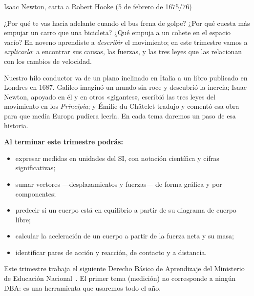 \documentclass[11pt]{article}
\begin{document}
\encabezado

{Isaac Newton, carta a Robert Hooke (5 de febrero de 1675/76)}


¿Por qué te vas hacia adelante cuando el bus frena de golpe? ¿Por qué cuesta más empujar un
carro que una bicicleta? ¿Qué empuja a un cohete en el espacio vacío? En noveno aprendiste a
\emph{describir} el movimiento; en este trimestre vamos a \emph{explicarlo}: a encontrar sus
causas, las fuerzas, y las tres leyes que las relacionan con los cambios de velocidad.

Nuestro hilo conductor va de un plano inclinado en Italia a un libro publicado en Londres en
1687. Galileo imaginó un mundo sin roce y descubrió la inercia; Isaac Newton, apoyado en él y
en otros «gigantes», escribió las tres leyes del movimiento en los \emph{Principia}; y
Émilie du Châtelet tradujo y comentó esa obra para que media Europa pudiera leerla. En cada
tema daremos un paso de esa historia.

\textbf{Al terminar este trimestre podrás:}
\begin{itemize}
  \item expresar medidas en unidades del SI, con notación científica y cifras significativas;
  \item sumar vectores ---desplazamientos y fuerzas--- de forma gráfica y por componentes;
  \item predecir si un cuerpo está en equilibrio a partir de su diagrama de cuerpo libre;
  \item calcular la aceleración de un cuerpo a partir de la fuerza neta y su masa;
  \item identificar pares de acción y reacción, de contacto y a distancia.
\end{itemize}

Este trimestre trabaja el siguiente Derecho Básico de Aprendizaje del Ministerio de Educación
Nacional~\cite{mendba}. El primer tema (medición) no corresponde a ningún DBA: es una
herramienta que usaremos todo el año.
\end{document}
